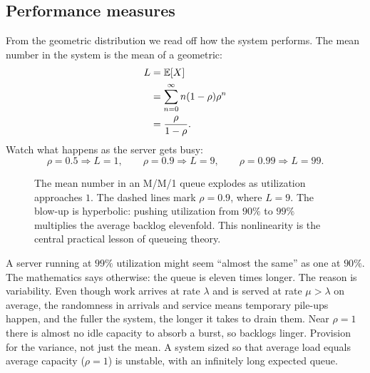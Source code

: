 \subsection{Performance measures}

From the geometric distribution we read off how the system performs. The mean number in the system
is the mean of a geometric:
\begin{align*}
  L &= \operatorname{\mathbb{E}}[X] \\
    &= \sum_{n=0}^{\infty} n(1-\rho)\rho^n \\
    &= \frac{\rho}{1-\rho}.
\end{align*}
Watch what happens as the server gets busy:
\[
  \rho = 0.5 \Rightarrow L = 1, \qquad
  \rho = 0.9 \Rightarrow L = 9, \qquad
  \rho = 0.99 \Rightarrow L = 99.
\]

\begin{figure}[H]
\centering
{}
\caption{The mean number in an M/M/1 queue explodes as utilization approaches $1$. The dashed lines
mark $\rho = 0.9$, where $L = 9$. The blow-up is hyperbolic: pushing utilization from $90\%$ to
$99\%$ multiplies the average backlog elevenfold. This nonlinearity is the central practical lesson of
queueing theory.}
\label{ch27:fig-L}
\end{figure}

\begin{trapbox}
A server running at $99\%$ utilization might seem ``almost the same'' as one at
$90\%$. The mathematics says otherwise: the queue is eleven times longer.
The reason is variability. Even though work arrives at rate $\lambda$ and is served at rate
$\mu > \lambda$ on average, the randomness in arrivals and service means temporary pile-ups
happen, and the fuller the system, the longer it takes to drain them. Near $\rho = 1$ there is almost
no idle capacity to absorb a burst, so backlogs linger. Provision for the variance, not just
the mean. A system sized so that average load equals average capacity ($\rho = 1$) is unstable,
with an infinitely long expected queue.
\end{trapbox}

